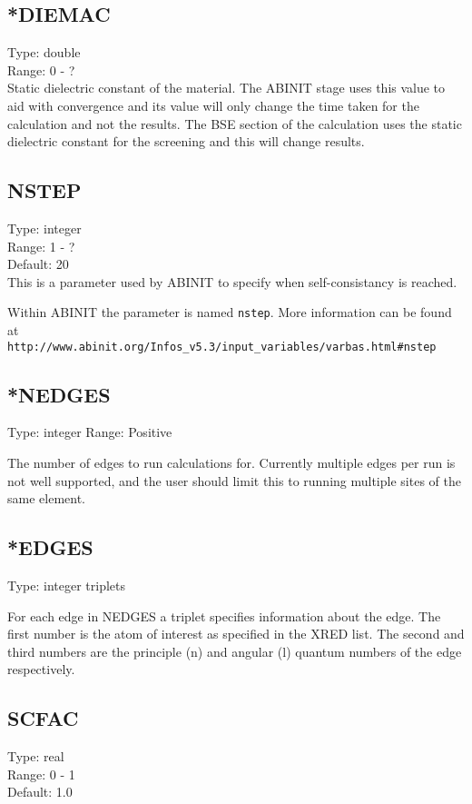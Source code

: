 \documentclass[12pt]{revtex4}
\begin{document}
\subsection{*DIEMAC}
Type: double \\
Range: 0 - ? \\

Static dielectric constant of the material. The \textsc{ABINIT} stage uses this value to aid with convergence and its value will only change the time taken for the calculation and not the results. The BSE section of 
the calculation uses the static dielectric constant for the screening and this will change results.

\subsection{NSTEP}
Type: integer \\
Range: 1 - ? \\
Default: 20  \\

This is a parameter used by \textsc{ABINIT} to specify when 
self-consistancy is reached. 

Within \textsc{ABINIT} the parameter is named \verb|nstep|.
More information can be found at 
\\ 
\verb|http://www.abinit.org/Infos_v5.3/input_variables/varbas.html#nstep|

\subsection{*NEDGES}
Type: integer
Range: Positive

The number of edges to run calculations for. Currently multiple edges per run is not well supported, and 
the user should limit this to running multiple sites of the same element.

\subsection{*EDGES}
Type: integer triplets

For each edge in NEDGES a triplet specifies information about the edge. The first number is the atom of
 interest as specified in the XRED list. The second and third numbers are the principle (n) and angular (l)
quantum numbers of the edge respectively. 

\subsection{SCFAC}
Type: real \\
Range: 0 - 1 \\
Default: 1.0 \\
\end{document}
